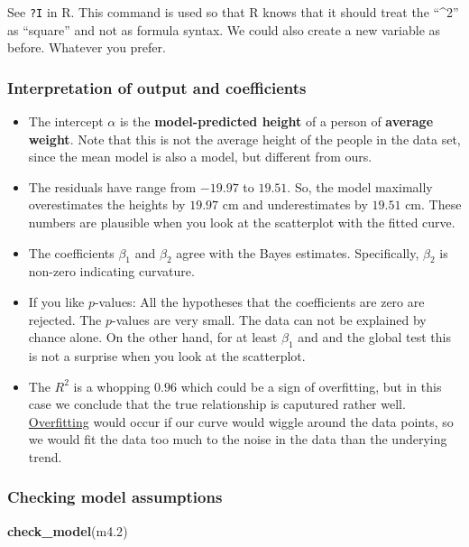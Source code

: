 \documentclass[
]{book}
\newenvironment{Shaded}{\begin{snugshade}}{\end{snugshade}}
\newcommand{\FloatTok}[1]{\textcolor[rgb]{0.00,0.00,0.81}{#1}}
\newcommand{\FunctionTok}[1]{\textcolor[rgb]{0.13,0.29,0.53}{\textbf{#1}}}
\newcommand{\NormalTok}[1]{#1}
\providecommand{\tightlist}{%
  \setlength{\itemsep}{0pt}\setlength{\parskip}{0pt}}
\begin{document}
See \texttt{?I} in R. This command is used so that R knows that it should
treat the ``\^{}2'' as ``square'' and not as formula syntax.
We could also create a new variable as before. Whatever you prefer.

\subsubsection{Interpretation of output and coefficients}\label{interpretation-of-output-and-coefficients}

\begin{itemize}
\tightlist
\item
  The intercept \(\alpha\) is the \textbf{model-predicted height} of a person of \textbf{average weight}.
  Note that this is not the average height of the people in the data set, since the
  mean model is also a model, but different from ours.
\item
  The residuals have range from \(-19.97\) to \(19.51\). So, the model maximally
  overestimates the heights by \(19.97\) cm and underestimates by \(19.51\) cm.
  These numbers are plausible when you look at the scatterplot with the fitted
  curve.
\item
  The coefficients \(\beta_1\) and \(\beta_2\) agree with the Bayes estimates.
  Specifically, \(\beta_2\) is non-zero indicating curvature.
\item
  If you like \(p\)-values: All the hypotheses that the coefficients are zero
  are rejected. The \(p\)-values are very small. The data can not be explained
  by chance alone. On the other hand, for at least \(\beta_1\) and
  and the global test this is not a surprise when you look at the scatterplot.
\item
  The \(R^2\) is a whopping \(0.96\) which could be a sign of overfitting, but
  in this case we conclude that the true relationship is caputured rather well.
  \href{https://en.wikipedia.org/wiki/Overfitting}{Overfitting} would occur if
  our curve would wiggle around the data points,
  so we would fit the data too much to the noise in the data than
  the underying trend.
\end{itemize}

\subsubsection{Checking model assumptions}\label{checking-model-assumptions}

\begin{Shaded}
\begin{Highlighting}[]
\FunctionTok{check\_model}\NormalTok{(m4}\FloatTok{.2}\NormalTok{)}
\end{Highlighting}
\end{Shaded}
\end{document}
